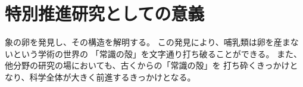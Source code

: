 
\section{特別推進研究としての意義}

	象の卵を発見し、その構造を解明する。
	この発見により、哺乳類は卵を産まないという学術の世界の
	「常識の殻」を文字通り打ち破ることができる。
	また、他分野の研究の場においても、古くからの「常識の殻」を
	打ち砕くきっかけとなり、科学全体が大きく前進するきっかけとなる。



